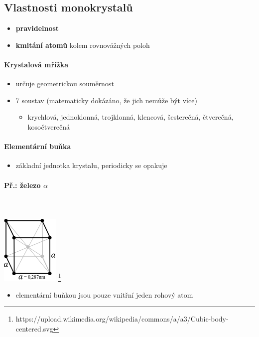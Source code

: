 \subsection{Vlastnosti monokrystalů}
\begin{itemize}
\item \textbf{pravidelnost}
\item \textbf{kmitání atomů} kolem rovnovážných poloh
\end{itemize}

\paragraph{Krystalová mřížka}
\begin{itemize}
\item určuje geometrickou souměrnost
\item 7 soustav (matematicky dokázáno, že jich nemůže být více)
\begin{itemize}
	\item krychlová, jednoklonná, trojklonná, klencová, šesterečná, čtverečná, kosočtverečná
\end{itemize}
\end{itemize}

\paragraph{Elementární buňka}
\begin{itemize}
\item základní jednotka krystalu, periodicky se opakuje
\end{itemize}

\paragraph{Př.: železo $\alpha$}\mbox{}\\ \mbox{} \\
\includegraphics[scale=0.5]{pictures/001.png}
\footnote{https://upload.wikimedia.org/wikipedia/commons/a/a3/Cubic-body-centered.svg}
\begin{itemize}
\item elementární buňkou jsou pouze vnitřní jeden rohový atom
\end{itemize}

